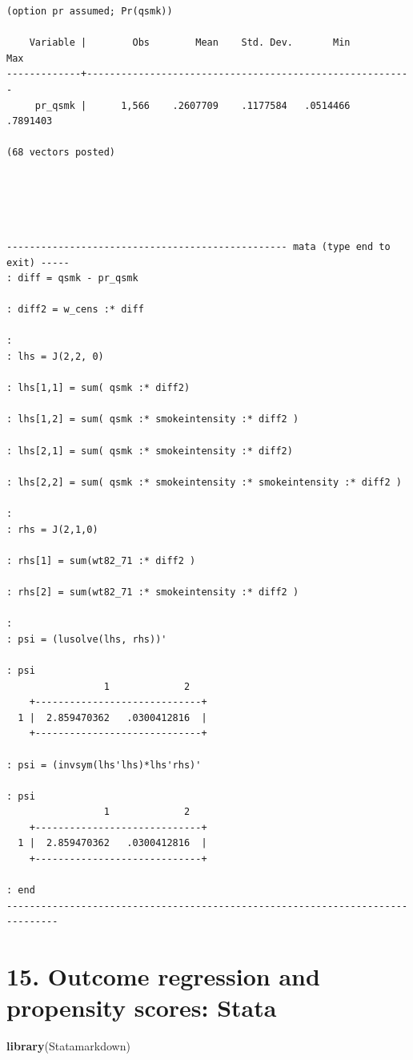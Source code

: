 \documentclass[
  10pt,
]{book}
\newenvironment{Shaded}{\begin{snugshade}}{\end{snugshade}}
\newcommand{\KeywordTok}[1]{\textcolor[rgb]{0.13,0.29,0.53}{\textbf{#1}}}
\newcommand{\NormalTok}[1]{#1}
\begin{document}
\begin{verbatim}
(option pr assumed; Pr(qsmk))

    Variable |        Obs        Mean    Std. Dev.       Min        Max
-------------+---------------------------------------------------------
     pr_qsmk |      1,566    .2607709    .1177584   .0514466   .7891403

(68 vectors posted)





------------------------------------------------- mata (type end to exit) -----
: diff = qsmk - pr_qsmk

: diff2 = w_cens :* diff

: 
: lhs = J(2,2, 0)

: lhs[1,1] = sum( qsmk :* diff2)

: lhs[1,2] = sum( qsmk :* smokeintensity :* diff2 )

: lhs[2,1] = sum( qsmk :* smokeintensity :* diff2)

: lhs[2,2] = sum( qsmk :* smokeintensity :* smokeintensity :* diff2 )

:                                                                 
: rhs = J(2,1,0)

: rhs[1] = sum(wt82_71 :* diff2 )

: rhs[2] = sum(wt82_71 :* smokeintensity :* diff2 )

: 
: psi = (lusolve(lhs, rhs))'

: psi
                 1             2
    +-----------------------------+
  1 |  2.859470362   .0300412816  |
    +-----------------------------+

: psi = (invsym(lhs'lhs)*lhs'rhs)'

: psi
                 1             2
    +-----------------------------+
  1 |  2.859470362   .0300412816  |
    +-----------------------------+

: end
-------------------------------------------------------------------------------
\end{verbatim}

\hypertarget{outcome-regression-and-propensity-scores-stata}{%
\chapter*{15. Outcome regression and propensity scores: Stata}\label{outcome-regression-and-propensity-scores-stata}}

\begin{Shaded}
\begin{Highlighting}[]
\KeywordTok{library}\NormalTok{(Statamarkdown)}
\end{Highlighting}
\end{Shaded}
\end{document}
